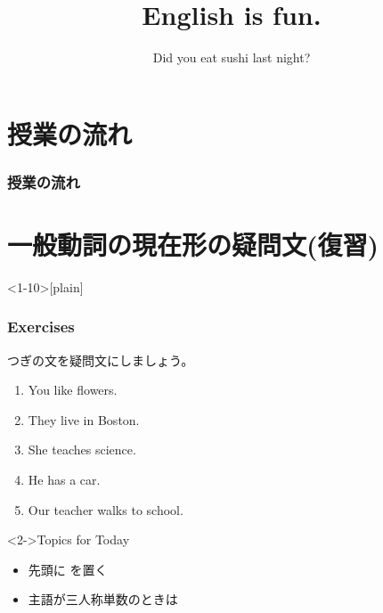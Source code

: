 \documentclass[aspectratio=169,xcolor={dvipsnames,table}]{beamer}
\title{English is fun.}
\subtitle{Did you eat sushi last night?}
\author{}
\institute[]{}
\date[]
\newcommand{\myaudio}[1]{\href{#1}{\faVolumeUp}}
\begin{document}
\begin{frame}[plain]
  \titlepage
\end{frame}

\section*{授業の流れ}
\begin{frame}[plain]
  \frametitle{授業の流れ}
  \tableofcontents
\end{frame}

\section{一般動詞の現在形の疑問文(復習)}
 
\begin{frame}<1-10>[plain]\frametitle{Exercises}

つぎの文を疑問文にしましょう。

 \begin{enumerate}
  \item<1-> You like flowers.\hspace{59.7pt}
  \item<1-> They live in Boston.\hspace{47.5pt}%
  \item<1-> She teaches science.\hspace{42pt}%
  \item<1-> He has  a car.\hspace{80.5pt}%
  \item<1-> Our teacher walks to school.
 \end{enumerate}

\begin{exampleblock}<2->{Topics for Today}
\begin{itemize}[square]\small
 \item<3->   先頭に  を置く\pause
 \item<4->   主語が三人称単数のときは 
\end{itemize}
\end{exampleblock}
\vspace{-10pt}
%
 \mbox{}\hfill\myaudio{./audio/027_past_did_you_01.mp3}

\end{frame}
\end{document}
